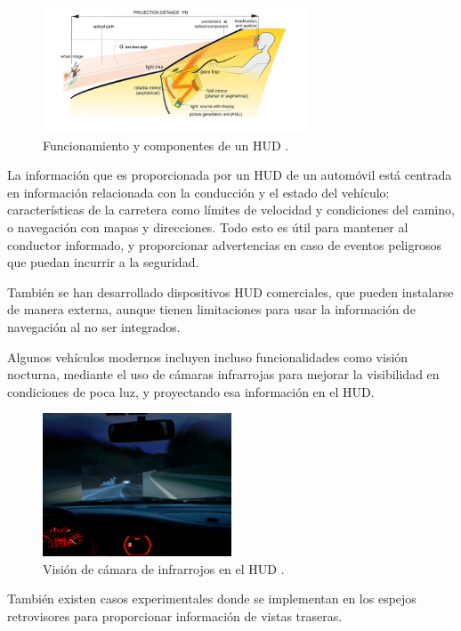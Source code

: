 \documentclass[12pt]{report} %
\begin{document}
\begin{figure}[h]
    \centering
    \includegraphics[width=0.7\textwidth]{hudWork.png}
    \caption{Funcionamiento y componentes de un HUD \cite{hudPaper}.}
    \label{fig:imagen8}
\end{figure}

La información que es proporcionada por un HUD de un automóvil está centrada en información relacionada con la conducción y el estado del vehículo: características de la carretera como límites de velocidad y condiciones del camino, o navegación con mapas y direcciones. Todo esto es útil para mantener al conductor informado, y proporcionar advertencias en caso de eventos peligrosos que puedan incurrir a la seguridad.

También se han desarrollado dispositivos HUD comerciales, que pueden instalarse de manera externa, aunque tienen limitaciones para usar la información de navegación al no ser integrados. 

Algunos vehículos modernos incluyen incluso funcionalidades como visión nocturna, mediante el uso de cámaras infrarrojas para mejorar la visibilidad en condiciones de poca luz, y proyectando esa información en el HUD. 

\begin{figure}[h]
    \centering
    \includegraphics[width=0.5\textwidth]{nigthHUD.png}
    \caption{Visión de cámara de infrarrojos en el HUD \cite{hudPaper}.}
    \label{fig:imagen9}
\end{figure}

También existen casos experimentales donde se implementan en los espejos retrovisores para proporcionar información de vistas traseras. 
\end{document}
